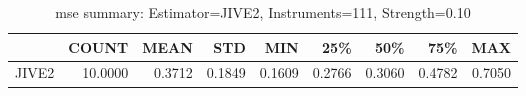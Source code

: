 \begin{table}[ht]
\centering
\caption{mse summary: Estimator=JIVE2, Instruments=111, Strength=0.10}
\begin{tabular}{lrrrrrrrr}
\toprule
 & COUNT & MEAN & STD & MIN & 25\% & 50\% & 75\% & MAX \\
\midrule
JIVE2 & 10.0000 & 0.3712 & 0.1849 & 0.1609 & 0.2766 & 0.3060 & 0.4782 & 0.7050 \\
\bottomrule
\end{tabular}
\end{table}
